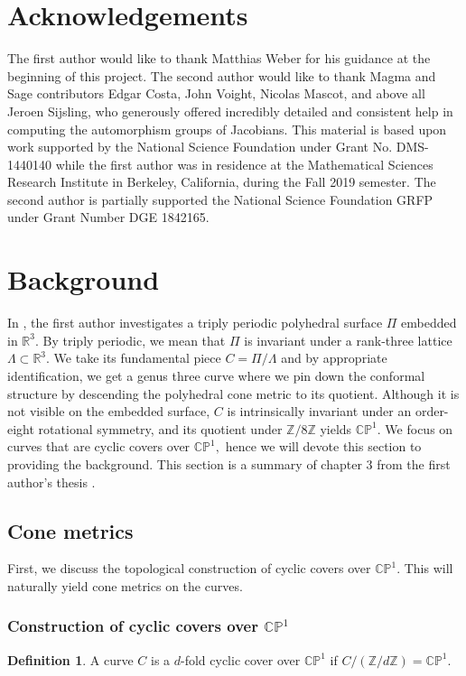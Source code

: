 \documentclass[12pt,reqno]{amsart}
\newcommand{\Z}{\mathbb{Z}}
\newcommand{\R}{\mathbb{R}}
\theoremstyle{definition}
\newtheorem{defn}{Definition}
\theoremstyle{remark}
\begin{document}
\section*{Acknowledgements} 
The first author would like to thank Matthias Weber for his guidance at the beginning of this project. The second author would like to thank Magma and Sage contributors Edgar Costa, John Voight, Nicolas Mascot, and above all Jeroen Sijsling, who generously offered incredibly detailed and consistent help in computing the automorphism groups of Jacobians. This material is based upon work supported by the National Science Foundation under Grant No. DMS-1440140 while the first author was in residence at the Mathematical Sciences Research Institute in Berkeley, California, during the Fall 2019 semester. The second author is partially supported the National Science Foundation GRFP under Grant Number DGE 1842165. 

\section{Background}
\label{sec: dthesis}
In \cite{dami}, the first author investigates a triply periodic polyhedral surface $\Pi$ embedded in $\mathbb{R}^3.$ By triply periodic, we mean that $\Pi$ is invariant under a rank-three lattice $\Lambda \subset \R^3.$ We take its fundamental piece $C = \Pi / \Lambda$ and by appropriate identification, we get a genus three curve where we pin down the conformal structure by descending the polyhedral cone metric to its quotient. Although it is not visible on the embedded surface, $C$ is intrinsically invariant under an order-eight rotational symmetry, and its quotient under $\Z/ 8 \Z$ yields $\mathbb{C}\mathbb{P}^1.$ We focus on curves that are cyclic covers over $\mathbb{C}\mathbb{P}^1,$ hence we will devote this section to providing the background. This section is a summary of chapter 3 from the first author's thesis \cite{dthesis}. 

\subsection{Cone metrics}
First, we discuss the topological construction of cyclic covers over $\mathbb{C}\mathbb{P}^1.$ This will naturally yield cone metrics on the curves.

\subsubsection*{Construction of cyclic covers over $\mathbb{C}\mathbb{P}^1$}
\begin{defn} A curve $C$ is a $d$-fold cyclic cover over $\mathbb{C}\mathbb{P}^1$ if $C / (\Z/ d \Z) = \mathbb{C}\mathbb{P}^1.$ \end{defn}
\end{document}
